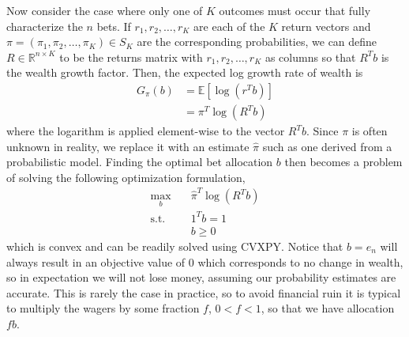 \documentclass[12pt,twoside]{report}
\begin{document}
Now consider the case where only one of $K$ outcomes must occur that fully characterize the $n$ bets. If $r_1, r_2, \ldots, r_K$ are each of the $K$ return vectors and $\pi = (\pi_1, \pi_2, \ldots, \pi_K) \in S_K$ are the corresponding probabilities, we can define $R \in \mathbb{R}^{n \times K}$ to be the returns matrix with $r_1, r_2, \ldots, r_K$ as columns so that $R^T b$ is the wealth growth factor. Then, the expected log growth rate of wealth is
$$\begin{aligned}
    G_{\pi} (b) &= \mathbb{E}[\log(r^T b)] \\
                &= \pi^T \log(R^Tb)
\end{aligned}$$
where the logarithm is applied element-wise to the vector $R^T b$. Since $\pi$ is often unknown in reality, we replace it with an estimate $\hat{\pi}$ such as one derived from a probabilistic model. Finding the optimal bet allocation $b$ then becomes a problem of solving the following optimization formulation,
$$\begin{aligned}
    \max_{b} \quad & \hat{\pi}^T \log(R^Tb) \\
    \textrm{s.t.} \quad & 1^T b = 1 \\
                        & b \geq 0
\end{aligned}$$
which is convex and can be readily solved using CVXPY. Notice that $b = e_n$ will always result in an objective value of $0$ which corresponds to no change in wealth, so in expectation we will not lose money, assuming our probability estimates are accurate. This is rarely the case in practice, so to avoid financial ruin it is typical to multiply the wagers by some fraction $f$, $0 < f < 1$, so that we have allocation $fb$.
\end{document}

